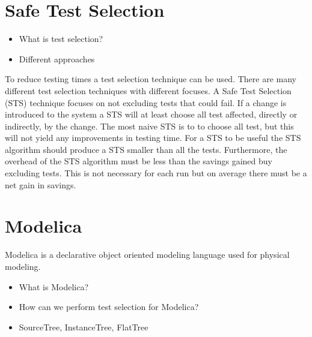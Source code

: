 \documentclass{cslthse-msc}
\begin{document}


\section{Safe Test Selection}
\begin{itemize}
	\item What is test selection?
	\item Different approaches
\end{itemize}
To reduce testing times a test selection technique can be used. There are many different test selection techniques with different focuses. A Safe Test Selection (STS) technique focuses on not excluding tests that could fail. If a change is introduced to the system a STS will at least choose all test affected, directly or indirectly, by the change. The most naive STS is to to choose all test, but this will not yield any improvements in testing time. For a STS to be useful the STS algorithm should produce a STS smaller than all the tests. Furthermore, the overhead of the STS algorithm must be less than the savings gained buy excluding tests. This is not necessary for each run but on average there must be a net gain in savings.


\section{Modelica}
Modelica is a declarative object oriented modeling language used for physical modeling.
\begin{itemize}
	\item What is Modelica?
	\item How can we perform test selection for Modelica?
	\item SourceTree, InstanceTree, FlatTree
	\end{itemize}
\end{document}
